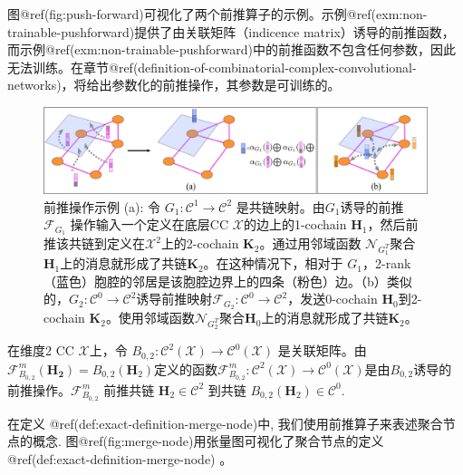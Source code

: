 \documentclass[
  12pt,
]{krantz}
\begin{document}
图@ref(fig:push-forward)可视化了两个前推算子的示例。示例@ref(exm:non-trainable-pushforward)提供了由关联矩阵（indicence
matrix）诱导的前推函数，而示例@ref(exm:non-trainable-pushforward)中的前推函数不包含任何参数，因此无法训练。在章节@ref(definition-of-combinatorial-complex-convolutional-networks)，将给出参数化的前推操作，其参数是可训练的。

\begin{figure}

{\centering \includegraphics{figures/push_forward} 

}

\caption{前推操作示例 (a): 令 $G_1\colon \mathcal{C}^1\to \mathcal{C}^2$ 是共链映射。由$G_1$诱导的前推 $\mathcal{F}_{G_1}$ 操作输入一个定义在底层CC $\mathcal{X}$的边上的1-cochain $\textbf{H}_{1}$，然后前推该共链到定义在$\mathcal{X}^2$上的2-cochain $\mathbf{K}_2$。通过用邻域函数 $\mathcal{N}_{G_1^T}$聚合$\mathbf{H}_1$上的消息就形成了共链$\mathbf{K}_2$。在这种情况下，相对于 $G_1$，2-rank（蓝色）胞腔的邻居是该胞腔边界上的四条（粉色）边。（b）类似的，$G_2\colon \mathcal{C}^0\to \mathcal{C}^2$诱导前推映射$\mathcal{F}_{G_2}\colon \mathcal{C}^0\to \mathcal{C}^2$，发送0-cochain $\mathbf{H}_0$到2-cochain $\mathbf{K}_2$。使用邻域函数$\mathcal{N}_{G_2^T}$聚合$\mathbf{H}_0$上的消息就形成了共链$\mathbf{K}_2$。}\label{fig:push-forward}
\end{figure}

\label{non-trainable-pushforward}
在维度2 CC \(\mathcal{X}\)上，令
\(B_{0,2}\colon \mathcal{C}^2 (\mathcal{X})\to \mathcal{C}^0 (\mathcal{X})\)
是关联矩阵。由\(\mathcal{F}^{m}_{B_{0,2}}(\mathbf{H_{2}})= B_{0,2} (\mathbf{H}_{2})\)定义的函数\(\mathcal{F}^{m}_{B_{0,2}}\colon\mathcal{C}^2 (\mathcal{X})\to \mathcal{C}^0 (\mathcal{X})\)是由\(B_{0,2}\)诱导的前推操作。\(\mathcal{F}^{m}_{B_{0,2}}\)
前推共链 \(\mathbf{H}_{2}\in \mathcal{C}^2\) 到共链
\(B_{0,2} (\mathbf{H}_{2}) \in \mathcal{C}^0\).

在定义 @ref(def:exact-definition-merge-node)中,
我们使用前推算子来表述聚合节点的概念.
图@ref(fig:merge-node)用张量图可视化了聚合节点的定义@ref(def:exact-definition-merge-node)
。
\end{document}
